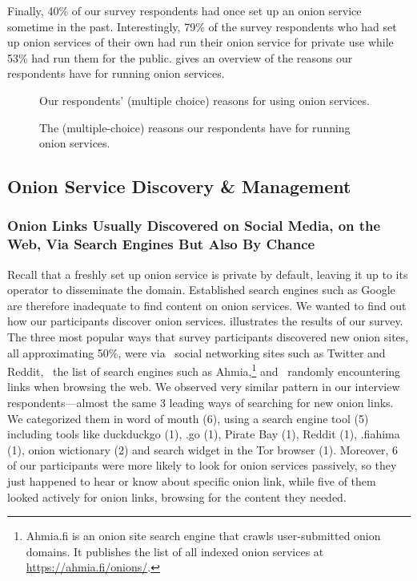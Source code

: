 Finally, 40\% of our survey respondents had once set up an onion service
sometime in the past.  Interestingly, 79\% of the survey respondents who had set
up onion services of their own had run their onion service for private use while
53\% had run them for the public.  gives an
overview of the reasons our respondents have for running onion services. 

\begin{figure}[t]
    \centering
    
    \caption{Our respondents' (multiple choice) reasons for using onion
    services.}
    \label{fig:onion-usage}
\end{figure}

\begin{figure}[t]
    \centering
    
    \caption{The (multiple-choice) reasons our respondents have for running
    onion services.}
    \label{fig:onion-operation-reasons}
\end{figure}

\subsection{Onion Service Discovery \& Management}
\label{sec:manage}

\subsubsection{Onion Links Usually Discovered on Social Media, on the Web, Via Search Engines But Also By Chance}

Recall that a freshly set up onion service is private by default, leaving it up
to its operator to disseminate the domain.  Established search engines such as
Google are therefore inadequate to find content on onion services.  We wanted to
find out how our participants discover onion services.
 illustrates the results of our survey.  The three
most popular ways that survey participants discovered new onion sites, all
approximating 50\%, were via \first~social networking sites such as Twitter and
Reddit, \second~the list of search engines such as Ahmia,\footnote{Ahmia.fi is
an onion site search engine that crawls user-submitted onion domains.  It
publishes the list of all indexed onion services at
\url{https://ahmia.fi/onions/}.} and \third~randomly encountering links when
browsing the web.  We observed very similar pattern in our interview
respondents---almost the same 3 leading ways of searching for new onion links.
We categorized them in word of mouth (6), using a search engine tool (5)
including tools like duckduckgo (1), .go (1), Pirate Bay (1), Reddit (1),
.fiahima (1), onion wictionary (2) and search widget in the Tor browser (1).
Moreover, 6 of our participants were more likely to look for onion services
passively, so they just happened to hear or know about specific onion link,
while five of them looked actively for onion links, browsing for the content
they needed.

